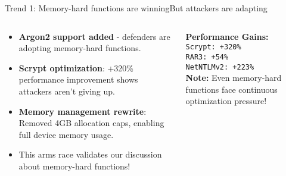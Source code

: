 \documentclass[aspectratio=169, lualatex, handout]{beamer}
\begin{document}
\begin{frame}{Trend 1: Memory-hard functions are winning}{But attackers are adapting}
	\begin{columns}[c]
		\begin{column}{0.55\textwidth}
			\begin{itemize}[<+->]
				\item \textbf{Argon2 support added} - defenders are adopting memory-hard functions.
				\item \textbf{Scrypt optimization}: +320\% performance improvement shows attackers aren't giving up.
				\item \textbf{Memory management rewrite}: Removed 4GB allocation caps, enabling full device memory usage.
				\item This arms race validates our discussion about memory-hard functions!
			\end{itemize}
		\end{column}
		\begin{column}{0.45\textwidth}
			\begin{tcolorbox}[colback=black!5!white,colframe=ciphergray]
				\textbf{Performance Gains:}\\
				\texttt{Scrypt: +320\%}\\
				\texttt{RAR3: +54\%}\\
				\texttt{NetNTLMv2: +223\%}\\[0.5em]
				\textcolor{cipherprimary}{\textbf{Note:} \small Even memory-hard functions face continuous optimization pressure!}
			\end{tcolorbox}
		\end{column}
	\end{columns}
\end{frame}
\end{document}
